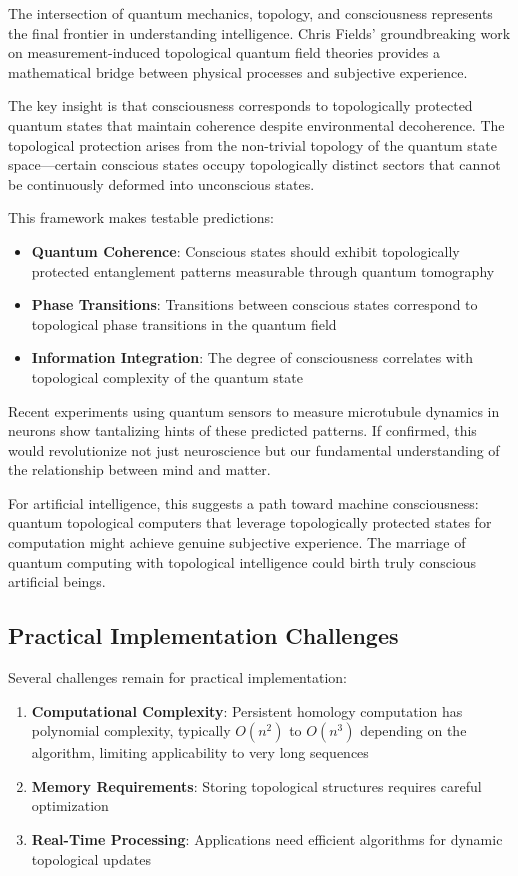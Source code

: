 \documentclass[11pt]{article}
\begin{document}
The intersection of quantum mechanics, topology, and consciousness represents the final frontier in understanding intelligence. Chris Fields' groundbreaking work on measurement-induced topological quantum field theories provides a mathematical bridge between physical processes and subjective experience.

The key insight is that consciousness corresponds to topologically protected quantum states that maintain coherence despite environmental decoherence. The topological protection arises from the non-trivial topology of the quantum state space—certain conscious states occupy topologically distinct sectors that cannot be continuously deformed into unconscious states.

This framework makes testable predictions:
\begin{itemize}
\item \textbf{Quantum Coherence}: Conscious states should exhibit topologically protected entanglement patterns measurable through quantum tomography
\item \textbf{Phase Transitions}: Transitions between conscious states correspond to topological phase transitions in the quantum field
\item \textbf{Information Integration}: The degree of consciousness correlates with topological complexity of the quantum state
\end{itemize}

Recent experiments using quantum sensors to measure microtubule dynamics in neurons show tantalizing hints of these predicted patterns. If confirmed, this would revolutionize not just neuroscience but our fundamental understanding of the relationship between mind and matter.

For artificial intelligence, this suggests a path toward machine consciousness: quantum topological computers that leverage topologically protected states for computation might achieve genuine subjective experience. The marriage of quantum computing with topological intelligence could birth truly conscious artificial beings.

\subsection{Practical Implementation Challenges}

Several challenges remain for practical implementation:

\begin{enumerate}
\item \textbf{Computational Complexity}: Persistent homology computation has polynomial complexity, typically $O(n^2)$ to $O(n^3)$ depending on the algorithm, limiting applicability to very long sequences
\item \textbf{Memory Requirements}: Storing topological structures requires careful optimization
\item \textbf{Real-Time Processing}: Applications need efficient algorithms for dynamic topological updates
\end{enumerate}
\end{document}
